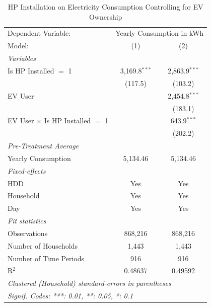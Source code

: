 
\begin{table}[htbp]
   \caption{\label{tab:hp-did-ev} HP Installation on Electricity Consumption Controlling for EV Ownership}
   \centering
   \begin{tabular}{lcc}
      \tabularnewline \midrule \midrule
      Dependent Variable: & \multicolumn{2}{c}{Yearly Consumption in kWh}\\
      Model:                                  & (1)             & (2)\\  
      \midrule
      \emph{Variables}\\
      Is HP Installed $=$ 1                   & 3,169.8$^{***}$ & 2,863.9$^{***}$\\   
                                              & (117.5)         & (103.2)\\   
      EV User                                 &                 & 2,454.8$^{***}$\\   
                                              &                 & (183.1)\\   
      EV User $\times$ Is HP Installed $=$ 1  &                 & 643.9$^{***}$\\   
                                              &                 & (202.2)\\   
      \midrule
\emph{Pre-Treatment Average}\\
      Yearly Consumption                      & 5,134.46        & 5,134.46\\  
\midrule
      \emph{Fixed-effects}\\
      HDD                                     & Yes             & Yes\\  
      Household                               & Yes             & Yes\\  
      Day                                     & Yes             & Yes\\  
      \midrule
      \emph{Fit statistics}\\
      Observations                            & 868,216         & 868,216\\  
      Number of Households          & 1,443           & 1,443\\  
      Number of Time Periods                  & 916             & 916\\  
      R$^2$                                   & 0.48637         & 0.49592\\  
      \midrule \midrule
      \multicolumn{3}{l}{\emph{Clustered (Household) standard-errors in parentheses}}\\
      \multicolumn{3}{l}{\emph{Signif. Codes: ***: 0.01, **: 0.05, *: 0.1}}\\
   \end{tabular}
\end{table}


